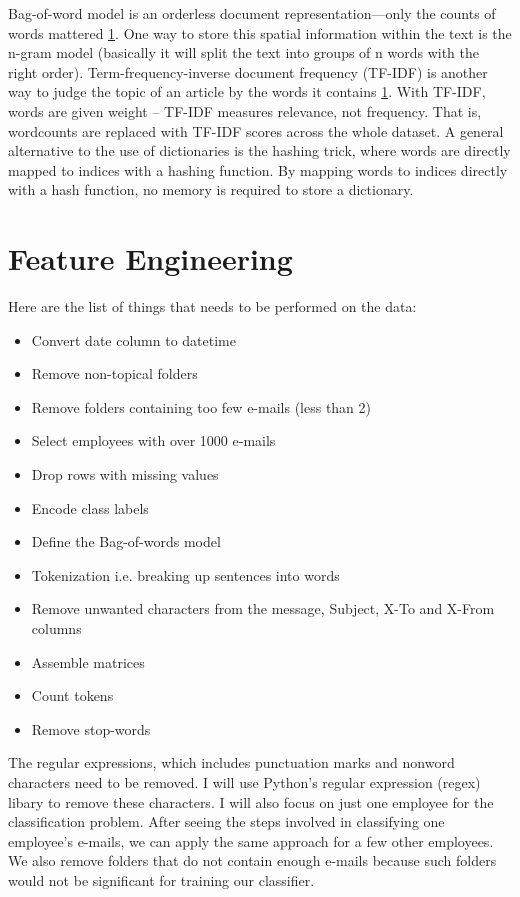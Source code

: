 \documentclass[11pt,fleqn]{book} %
\begin{document}
Bag-of-word model is an orderless document representation—only the counts of words mattered \ref{}. One way to store this spatial information within the text is the n-gram model (basically it will split the text into groups of n words with the right order). Term-frequency-inverse document frequency (TF-IDF) is another way to judge the topic of an article by the words it contains \ref{}. With TF-IDF, words are given weight – TF-IDF measures relevance, not frequency. That is, wordcounts are replaced with TF-IDF scores across the whole dataset. A general alternative to the use of dictionaries is the hashing trick, where words are directly mapped to indices with a hashing function. By mapping words to indices directly with a hash function, no memory is required to store a dictionary. 

\section{Feature Engineering}
Here are the list of things that needs to be performed on the data:
\begin{itemize}
\item Convert date column to datetime
\item Remove non-topical folders
\item Remove folders containing too few e-mails (less than 2)
\item Select employees with over 1000 e-mails
\item Drop rows with missing values
\item Encode class labels
\item Define the Bag-of-words model
\item Tokenization i.e. breaking up sentences into words 
\item Remove unwanted characters from the message, Subject, X-To and X-From columns
\item Assemble matrices
\item Count tokens
\item Remove stop-words
\end{itemize}

The regular expressions, which includes punctuation marks and nonword characters need to be removed. I will use Python's regular expression (regex) libary to remove these characters. I will also focus on just one employee for the classification problem. After seeing the steps involved in classifying one employee's e-mails, we can apply the same approach for a few other employees. We also remove folders that do not contain enough e-mails because such folders would not be significant for training our classifier.
\end{document}
